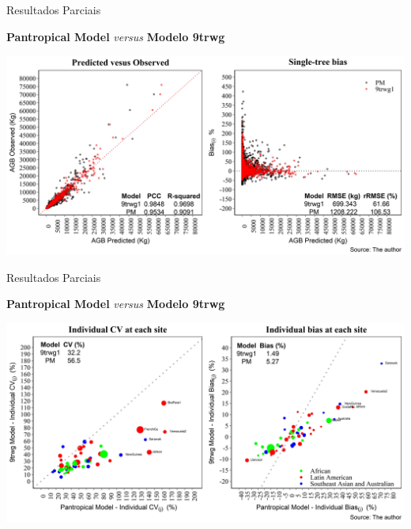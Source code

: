 \documentclass[12pt,ignorenonframetext,aspectratio=1610]{beamer}
\begin{document}
\begin{frame}[c]{Resultados Parciais}
	
	\centering
	\textbf{Pantropical Model} \textit{versus} \textbf{Modelo 9trwg}
	
	\begin{center}
		\includegraphics[scale=0.5]{Fig/CH_WkNN}
	\end{center}
	
\end{frame}


\begin{frame}[c]{Resultados Parciais}
	
	\centering
	\textbf{Pantropical Model} \textit{versus} \textbf{Modelo 9trwg}
	
	\begin{center}
		\includegraphics[scale=0.5]{Fig/CV_Bias}
	\end{center}
	
\end{frame}
\end{document}
